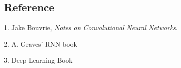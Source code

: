 \subsection{Reference}

1. Jake Bouvrie, {\it Notes on Convolutional Neural Networks}.

2. A. Graves' RNN book

3. Deep Learning Book



